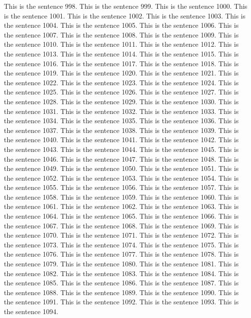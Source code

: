 \documentclass{article}
\begin{document}
This is the sentence 998.
This is the sentence 999.
This is the sentence 1000.
This is the sentence 1001.
This is the sentence 1002.
This is the sentence 1003.
This is the sentence 1004.
This is the sentence 1005.
This is the sentence 1006.
This is the sentence 1007.
This is the sentence 1008.
This is the sentence 1009.
This is the sentence 1010.
This is the sentence 1011.
This is the sentence 1012.
This is the sentence 1013.
This is the sentence 1014.
This is the sentence 1015.
This is the sentence 1016.
This is the sentence 1017.
This is the sentence 1018.
This is the sentence 1019.
This is the sentence 1020.
This is the sentence 1021.
This is the sentence 1022.
This is the sentence 1023.
This is the sentence 1024.
This is the sentence 1025.
This is the sentence 1026.
This is the sentence 1027.
This is the sentence 1028.
This is the sentence 1029.
This is the sentence 1030.
This is the sentence 1031.
This is the sentence 1032.
This is the sentence 1033.
This is the sentence 1034.
This is the sentence 1035.
This is the sentence 1036.
This is the sentence 1037.
This is the sentence 1038.
This is the sentence 1039.
This is the sentence 1040.
This is the sentence 1041.
This is the sentence 1042.
This is the sentence 1043.
This is the sentence 1044.
This is the sentence 1045.
This is the sentence 1046.
This is the sentence 1047.
This is the sentence 1048.
This is the sentence 1049.
This is the sentence 1050.
This is the sentence 1051.
This is the sentence 1052.
This is the sentence 1053.
This is the sentence 1054.
This is the sentence 1055.
This is the sentence 1056.
This is the sentence 1057.
This is the sentence 1058.
This is the sentence 1059.
This is the sentence 1060.
This is the sentence 1061.
This is the sentence 1062.
This is the sentence 1063.
This is the sentence 1064.
This is the sentence 1065.
This is the sentence 1066.
This is the sentence 1067.
This is the sentence 1068.
This is the sentence 1069.
This is the sentence 1070.
This is the sentence 1071.
This is the sentence 1072.
This is the sentence 1073.
This is the sentence 1074.
This is the sentence 1075.
This is the sentence 1076.
This is the sentence 1077.
This is the sentence 1078.
This is the sentence 1079.
This is the sentence 1080.
This is the sentence 1081.
This is the sentence 1082.
This is the sentence 1083.
This is the sentence 1084.
This is the sentence 1085.
This is the sentence 1086.
This is the sentence 1087.
This is the sentence 1088.
This is the sentence 1089.
This is the sentence 1090.
This is the sentence 1091.
This is the sentence 1092.
This is the sentence 1093.
This is the sentence 1094.
\end{document}
